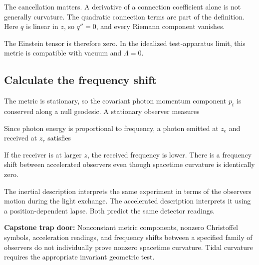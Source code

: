 \documentclass[
  11pt,
  letterpaper,
  oneside,
  openany]{scrbook}
\renewenvironment{quote}{\begin{tcolorbox}[enhanced,breakable,sharp corners,colback=pale,colframe=accent,boxrule=0pt,borderline west={2pt}{0pt}{accent},left=10pt,right=10pt,top=7pt,bottom=7pt]}{\end{tcolorbox}}
\begin{document}
The cancellation matters. A derivative of a connection coefficient alone
is not generally curvature. The quadratic connection terms are part of
the definition. Here \(q\) is linear in \(z\), so \(q''=0\), and every
Riemann component vanishes.

The Einstein tensor is therefore zero. In the idealized test-apparatus
limit, this metric is compatible with vacuum and \(\Lambda=0\).

\hypertarget{calculate-the-frequency-shift}{%
\subsection{Calculate the frequency
shift}\label{calculate-the-frequency-shift}}

The metric is stationary, so the covariant photon momentum component
\(p_t\) is conserved along a null geodesic. A stationary observer
measures

\begin{center}
\begingroup
{}
\ifdim\wd\grmathbox>\linewidth
\resizebox{\linewidth}{!}{\usebox{\grmathbox}}
\else\usebox{\grmathbox}\fi
\endgroup
\end{center}

Since photon energy is proportional to frequency, a photon emitted at
\(z_e\) and received at \(z_r\) satisfies

\begin{center}
\begingroup
{}
\ifdim\wd\grmathbox>\linewidth
\resizebox{\linewidth}{!}{\usebox{\grmathbox}}
\else\usebox{\grmathbox}\fi
\endgroup
\end{center}

If the receiver is at larger \(z\), the received frequency is lower.
There is a frequency shift between accelerated observers even though
spacetime curvature is identically zero.

The inertial description interprets the same experiment in terms of the
observers\textquotesingle{} motion during the light exchange. The
accelerated description interprets it using a position-dependent lapse.
Both predict the same detector readings.

\begin{quote}
\textbf{Capstone trap door:} Nonconstant metric components, nonzero
Christoffel symbols, acceleration readings, and frequency shifts between
a specified family of observers do not individually prove nonzero
spacetime curvature. Tidal curvature requires the appropriate invariant
geometric test.
\end{quote}
\end{document}

